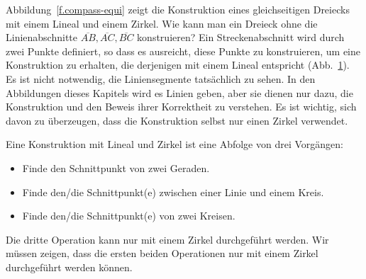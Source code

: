 Abbildung~\ref{f.compass-equi} zeigt die Konstruktion eines gleichseitigen Dreiecks mit einem Lineal und einem Zirkel. Wie kann man ein Dreieck ohne die Linienabschnitte $\overline{AB}, \overline{AC}, \overline{BC}$ konstruieren? Ein Streckenabschnitt wird durch zwei Punkte definiert, so dass es ausreicht, diese Punkte zu konstruieren, um eine Konstruktion zu erhalten, die derjenigen mit einem Lineal entspricht (Abb.~\ref{f.compass-equi-only}). Es ist nicht notwendig, die Liniensegmente tatsächlich zu sehen.
In den Abbildungen dieses Kapitels wird es Linien geben, aber sie dienen nur dazu, die Konstruktion und den Beweis ihrer Korrektheit zu verstehen. Es ist wichtig, sich davon zu überzeugen, dass die Konstruktion selbst nur einen Zirkel verwendet.
\begin{figure}[ht]
\subfigures
{}
\hfill
{}
\label{f.compass-equi}
\label{f.compass-equi-only}
\end{figure}

Eine Konstruktion mit Lineal und Zirkel ist eine Abfolge von drei Vorgängen:
\begin{itemize}
\item Finde den Schnittpunkt von zwei Geraden.
\item Finde den/die Schnittpunkt(e) zwischen einer Linie und einem Kreis.
\item Finde den/die Schnittpunkt(e) von zwei Kreisen.
\end{itemize}
Die dritte Operation kann nur mit einem Zirkel durchgeführt werden. Wir müssen zeigen, dass die ersten beiden Operationen nur mit einem Zirkel durchgeführt werden können.

